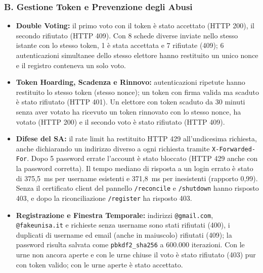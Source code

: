 \documentclass[12pt,a4paper]{article}
\begin{document}
\subsubsection*{B. Gestione Token e Prevenzione degli Abusi}
\begin{itemize}
  \item \textbf{Double Voting:} il primo voto con il token è stato accettato (HTTP 200), il secondo rifiutato (HTTP 409). Con 8 schede diverse inviate nello stesso istante con lo stesso token, 1 è stata accettata e 7 rifiutate (409); 6 autenticazioni simultanee dello stesso elettore hanno restituito un unico nonce e il registro conteneva un solo voto.
  \item \textbf{Token Hoarding, Scadenza e Rinnovo:} autenticazioni ripetute hanno restituito lo stesso token (stesso nonce); un token con firma valida ma scaduto è stato rifiutato (HTTP 401). Un elettore con token scaduto da 30 minuti senza aver votato ha ricevuto un token rinnovato con lo stesso nonce, ha votato (HTTP 200) e il secondo voto è stato rifiutato (HTTP 409).
  \item \textbf{Difese del SA:} il rate limit ha restituito HTTP 429 all'undicesima richiesta, anche dichiarando un indirizzo diverso a ogni richiesta tramite \texttt{X-Forwarded-For}. Dopo 5 password errate l'account è stato bloccato (HTTP 429 anche con la password corretta). Il tempo mediano di risposta a un login errato è stato di 375,5~ms per username esistenti e 371,8~ms per inesistenti (rapporto 0,99). Senza il certificato client del pannello \texttt{/reconcile} e \texttt{/shutdown} hanno risposto 403, e dopo la riconciliazione \texttt{/register} ha risposto 403.
  \item \textbf{Registrazione e Finestra Temporale:} indirizzi \texttt{@gmail.com}, \texttt{@fakeunisa.it} e richieste senza username sono stati rifiutati (400), i duplicati di username ed email (anche in maiuscolo) rifiutati (409); la password risulta salvata come \texttt{pbkdf2\_sha256} a 600.000 iterazioni. Con le urne non ancora aperte e con le urne chiuse il voto è stato rifiutato (403) pur con token valido; con le urne aperte è stato accettato.
\end{itemize}
\end{document}
